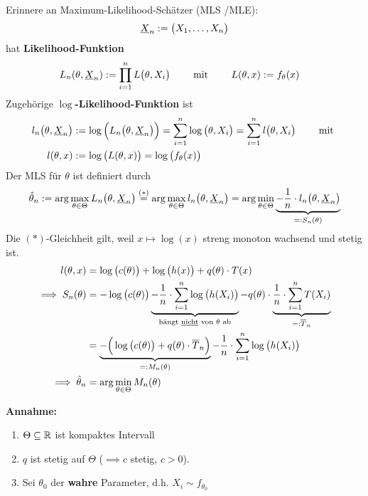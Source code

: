 Erinnere an Maximum-Likelihood-Schätzer (MLS /MLE):
\begin{align*}
	\underline{X}_n:=\big(X_1,\ldots,X_n\big)
\end{align*}
hat \textbf{Likelihood-Funktion}
\begin{align*}
	L_n(\theta,\underline{X}_n)&:=\prod\limits_{i=1}^n L\big(\theta,X_i\big)
	\qquad\text{ mit }\qquad
	L(\theta,x):=f_\theta(x)
\end{align*}
Zugehörige \textbf{$\log$-Likelihood-Funktion} ist
\begin{align*}
	l_n\big(\theta,\underline{X}_n\big)&:=\log\Big(L_n\big(\theta,\underline{X}_n\big)\Big)
	=\sum\limits_{i=1}^n\log\big(\theta,X_i\big)
	=\sum\limits_{i=1}^n l\big(\theta,X_i\big)\qquad\text{ mit }
\\
l(\theta,x)&:=\log\big(L(\theta,x)\big)=\log\big(f_\theta(x)\big)
\end{align*}
Der MLS für $\theta$ ist definiert durch
\begin{align*}
	\hat{\theta}_n
	:=\arg\max\limits_{\theta\in\Theta}L_n\big(\theta,\underline{X}_n\big)
	\overset{(\ast)}{=}
	\arg\max\limits_{\theta\in\Theta} l_n\big(\theta,\underline{X}_n\big)
	=\arg\min\limits_{\theta\in\Theta}\underbrace{-\frac{1}{n}\cdot  l_n\big(\theta,\underline{X}_n\big)}_{=:S_n(\theta)}
\end{align*}
Die $(\ast)$-Gleichheit gilt, weil $x\mapsto\log(x)$ streng monoton wachsend und stetig ist.
\begin{align*}
	l(\theta,x)&=\log\big(c(\theta)\big)+\log\big(h(x)\big)+q(\theta)\cdot T(x)\\
	\implies S_n(\theta)&=-\log\big(c(\theta)\big)\underbrace{-\frac{1}{n}\cdot\sum\limits_{i=1}^n\log\big(h(X_i)\big)}_{\text{hängt \underline{nicht} von $\theta$ ab}}-q(\theta)\cdot\underbrace{\frac{1}{n}\cdot\sum\limits_{i=1}^n T(X_i)}_{=:\overline{T}_n}\\
	&=\underbrace{-\Big(\log\big(c(\theta)\big)+q(\theta)\cdot\overline{T}_n\Big)}_{=:M_n(\theta)}-\frac{1}{n}\cdot\sum\limits_{i=1}^n\log\big(h(X_i)\big)\\
	\implies\hat{\theta}_n
	&=\arg\min\limits_{\theta\in\Theta} M_n(\theta)
\end{align*}


\textbf{Annahme:}
\begin{enumerate}[label=(\arabic*)]
	\item $\Theta\subseteq\mathbb{R}$ ist kompaktes Intervall
	\item $q$ ist stetig auf $\Theta$ ($\implies c$ stetig, $c>0$).
	\item Sei $\theta_0$ der \textbf{wahre} Parameter, d.h. $X_i\sim f_{\theta_0}$
\end{enumerate}

